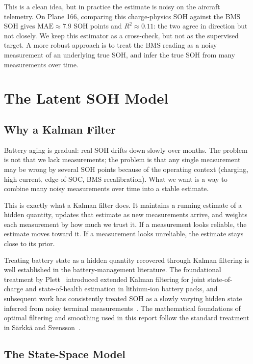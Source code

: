 \documentclass[11pt]{article}
\begin{document}
This is a clean idea, but in practice the estimate is noisy on the
aircraft telemetry. On Plane 166, comparing this charge-physics SOH
against the BMS SOH gives \(\mathrm{MAE} \approx 7.9\) SOH points and
\(R^2 \approx 0.11\): the two agree in direction but not closely. We
keep this estimator as a cross-check, but not as the supervised target. A more robust approach
is to treat the BMS reading as a noisy measurement of an underlying
true SOH, and infer the true SOH from many measurements over time.

\section{The Latent SOH Model}

\subsection{Why a Kalman Filter}

Battery aging is gradual: real SOH drifts down slowly over months. The
problem is not that we lack measurements; the problem is that any single
measurement may be wrong by several SOH points because of the operating
context (charging, high current, edge-of-SOC, BMS recalibration). What
we want is a way to combine many noisy measurements over time into a
stable estimate.

This is exactly what a Kalman filter does. It maintains a running
estimate of a hidden quantity, updates that estimate as new measurements
arrive, and weights each measurement by how much we trust it. If a
measurement looks reliable, the estimate moves toward it. If a
measurement looks unreliable, the estimate stays close to its prior.

Treating battery state as a hidden quantity recovered through Kalman
filtering is well established in the battery-management literature. The
foundational treatment by Plett~\cite{plett2004a,plett2004b,plett2004c}
introduced extended Kalman filtering for joint state-of-charge and
state-of-health estimation in lithium-ion battery packs, and subsequent
work has consistently treated SOH as a slowly varying hidden state
inferred from noisy terminal measurements~\cite{yang2021review}. The
mathematical foundations of optimal filtering and smoothing used in this
report follow the standard treatment in
S\"arkk\"a and Svensson~\cite{sarkka2023bayesian}.

\subsection{The State-Space Model}
\end{document}
